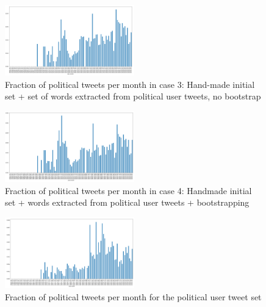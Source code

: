 \begin{figure}[h]
  \includegraphics[width=0.5\textwidth]{images/case3_pol.PNG}
  \caption{Fraction of political tweets per month in case 3: Hand-made initial set + set of words extracted from political user tweets, no bootstrap}
  \label{case_3_hist}
\end{figure}

\begin{figure}[h]
  \includegraphics[width=0.5\textwidth]{images/case4_pol.PNG}
  \caption{Fraction of political tweets per month in case 4: Handmade initial set + words extracted from political user tweets + bootstrapping}
  \label{case_4_hist}
\end{figure}

\begin{figure}[h]
  \includegraphics[width=0.5\textwidth]{images/original_users_pol.PNG}
  \caption{Fraction of political tweets per month for the political user tweet set}
  \label{original_user_pol_hist}
\end{figure}


